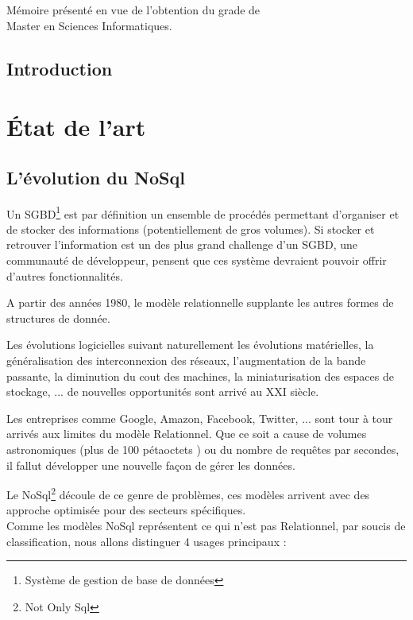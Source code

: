 \documentclass[a4paper,fleqn,12pt]{report}
\begin{document}
\vspace{0.5cm}
\begin{center}
M\'emoire pr\'esent\'e en vue de l'obtention du grade de\\
Master en Sciences Informatiques.
\end{center}
\tableofcontents
\newpage


\chapter*{Introduction}


 
\part{État de l'art}

\chapter*{L'évolution du NoSql}


Un SGBD\footnote{Système de gestion de base de données} est par définition un ensemble de procédés permettant d'organiser et de stocker des informations (potentiellement de gros volumes). Si stocker et retrouver l'information est un des plus grand challenge d'un SGBD, une communauté de développeur, pensent que ces système devraient pouvoir offrir d'autres fonctionnalités. 

A partir des années 1980, le modèle relationnelle supplante les autres formes de structures de donnée.

Les évolutions logicielles suivant naturellement les évolutions matérielles, la généralisation des interconnexion des réseaux, l'augmentation de la bande passante, la diminution du cout des machines, la miniaturisation des espaces de stockage, ... de nouvelles opportunités sont arrivé au XXI siècle.

Les entreprises comme Google, Amazon, Facebook, Twitter, ... sont tour à tour arrivés aux limites du modèle Relationnel. Que ce soit a cause de volumes astronomiques (plus de 100 pétaoctets ) ou du nombre de requêtes par secondes, il fallut développer une nouvelle façon de gérer les données.

Le NoSql\footnote{Not Only Sql} découle de ce genre de problèmes, ces modèles arrivent avec des approche optimisée pour des secteurs spécifiques. \\
Comme les modèles NoSql représentent ce qui n'est pas Relationnel, par soucis de classification, nous allons distinguer 4 usages principaux :
\end{document}
